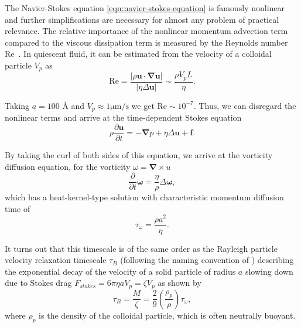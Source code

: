 \documentclass{doctoral}
\newcommand{\pd}{\partial}
\newcommand{\Reynolds}{\mathrm{Re}}
\begin{document}
The Navier-Stokes equation \eqref{eqn:navier-stokes-equation} is famously nonlinear and further simplifications are necessary for almost any problem of practical relevance.
The relative importance of the nonlinear momentum advection term compared to the viscous dissipation term is measured by the Reynolds number $\Reynolds$~\cite{Reynolds_1883}.
In quiescent fluid, it can be estimated from the velocity of a colloidal particle $V_p$ as
\begin{equation}
    \Reynolds = \frac{|\rho \bm{u} \cdot \bm{\nabla}\bm{u}|}{|\eta \Delta \bm{u}|} \sim \frac{\rho V_p L}{\eta}.
    \label{eqn:reynolds-based-estimate}
\end{equation}

Taking $a = 100$ \AA{} and $V_p \approx 1 \mathrm{\mu m / s}$  we get $\Reynolds \sim 10^{-7}$.
Thus, we can disregard the nonlinear terms and arrive at the time-dependent Stokes equation
\begin{equation}
    \rho \frac{\pd \bm{u}}{\pd t} = - \bm{\nabla} p + \eta \Delta \bm{u} + \bm{f}.
    \label{eqn:time-dependent-stokes-equation}
\end{equation}

By taking the curl of both sides of this equation, we arrive at the vorticity diffusion equation, for the vorticity $\omega = \bm{\nabla} \times u$
\begin{equation}
    \frac{\pd}{\pd t} \bm{\omega}  = \frac{\eta}{\rho} \Delta \bm{\omega} , \label{eqn:vorticity-diffusion}
\end{equation}
which has a heat-kernel-type solution with characteristic momentum diffusion time of
\begin{equation}
    \tau_\omega = \frac{\rho a^2}{\eta}.
    \label{eqn:vorticity-timescale}
\end{equation}

It turns out that this timescale is of the same order as the Rayleigh particle velocity relaxation timescale $\tau_B$ (following the naming convention of \textcite{vanKampen_2011}) describing the exponential decay of the velocity of a solid particle of radius $a$ slowing down due to Stokes drag $F_{stokes} = 6 \pi \eta a V_p = \zeta V_p$ as shown by
\begin{equation}
    \tau_B = \frac{M}{\zeta} = \frac{2}{9} \left( \frac{\rho_p}{\rho} \right) \tau_\omega, \label{eqn:raighley-timescale}
\end{equation}
where $\rho_p$ is the density of the colloidal particle, which is often neutrally buoyant.
\end{document}
